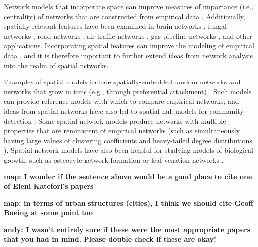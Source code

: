 \documentclass[%
 reprint,
 amsmath,amssymb,
 aps,
]{revtex4-1}
\begin{document}
Network models that incorporate space can improve measures of importance (i.e., centrality) of networks that are constructed from empirical data \cite{spatial1, air-traffic}. Additionally, spatially relevant features have been examined in brain networks \cite{braingrowth1, braingrowth2}, fungal networks \cite{fungal_data}, road networks {\color{red}\cite{road_data, spatial1, barbosa, boeing2018multi}}, air-traffic networks \cite{air-traffic}, gas-pipeline networks \cite{spatialefficiency}, and other applications. Incorporating spatial features can improve the modeling of empirical data \cite{barthelemy}, and it is therefore important to further extend ideas from network analysis into the realm of spatial networks.

Examples of spatial models include spatially-embedded random networks \cite{penrose-rgg, geographical_threshold} and networks that grow in time (e.g., through preferential attachment) \cite{mean_field_evolving_spatial, SPA1, spatial1}. Such models can provide reference models with which to compare empirical networks; and ideas from spatial networks have also led to spatial null models for community detection \cite{community1, community2}. %
Some spatial network models produce networks with multiple properties that are reminiscent of empirical networks (such as simultaneously having large values of clustering coefficients and heavy-tailed degree distributions \cite{geometric_preferential_attachment, geographical_threshold2}). Spatial network models have also been helpful for studying models of biological growth, such as osteocyte-network formation \cite{mean_field_evolving_spatial} {\color{red}or leaf venation networks \cite{leaf_optimization}.}

{\bf map: I wonder if the sentence above would be a good place to cite one of Eleni Katefori's papers}

{\bf map: in terms of urban structures (cities), I think we should cite Geoff Boeing at some point too}

{\bf andy: I wasn't entirely sure if these were the most appropriate papers that you had in mind. Please double check if these are okay!}
\end{document}
